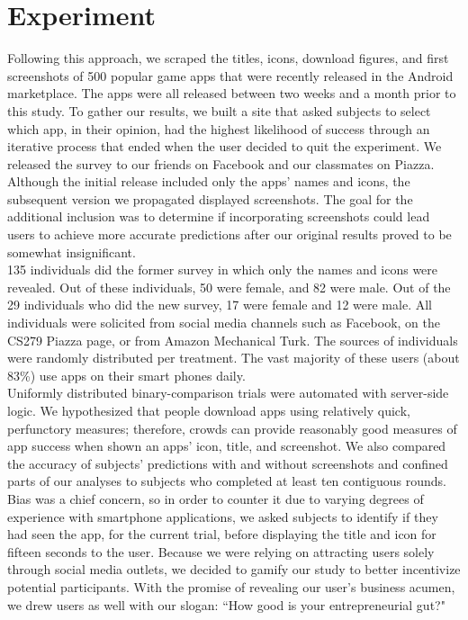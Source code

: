 \section{Experiment}


Following this approach, we scraped the titles, icons, download figures, and first screenshots of 500 popular game apps that were recently released in the Android marketplace.  The apps were all released between two weeks and a month prior to this study. To gather our results, we built a site that asked subjects to select which app, in their opinion, had the highest likelihood of success through an iterative process that ended when the user decided to quit the experiment.  We released the survey to our friends on Facebook and our classmates on Piazza. Although the initial release included only the apps' names and icons, the subsequent version we propagated displayed screenshots. The goal for the additional inclusion was to determine if incorporating screenshots could lead users to achieve more accurate predictions after our original results proved to be somewhat insignificant.  \\

135 individuals did the former survey in which only the names and icons were revealed. Out of these individuals, 50 were female, and 82 were male. Out of the 29 individuals who did the new survey, 17 were female and 12 were male. All individuals were solicited from social media channels such as Facebook, on the CS279 Piazza page, or from Amazon Mechanical Turk. The sources of individuals were randomly distributed per treatment. The vast majority of these users (about 83\%) use apps on their smart phones daily. \\

Uniformly distributed binary-comparison trials were automated with server-side logic. We hypothesized that people download apps using relatively quick, perfunctory measures; therefore, crowds can provide reasonably good measures of app success when shown an apps' icon, title, and screenshot. We also compared the accuracy of subjects' predictions with and without screenshots and confined parts of our analyses to subjects who completed at least ten contiguous rounds. Bias was a chief concern, so in order to counter it due to varying degrees of experience with smartphone applications, we asked subjects to identify if they had seen the app, for the current trial, before displaying the title and icon for fifteen seconds to the user. Because we were relying on attracting users solely through social media outlets, we decided to gamify our study to better incentivize potential participants. With the promise of revealing our user's business acumen, we drew users as well with our slogan: “How good is your entrepreneurial gut?"\\

